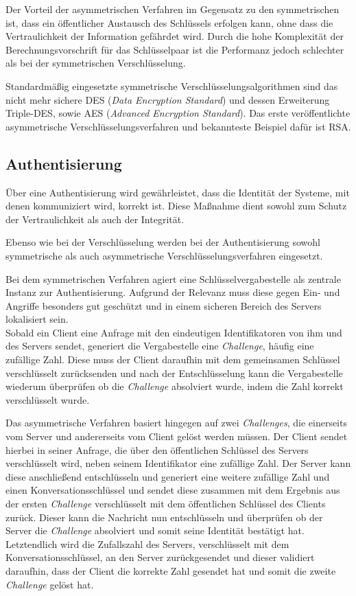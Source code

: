 \documentclass[12pt,a4paper,parskip=half]{scrreprt}
\begin{document}
Der Vorteil der asymmetrischen Verfahren im Gegensatz zu den symmetrischen ist, dass ein öffentlicher Austausch des Schlüssels erfolgen kann, ohne dass die Vertraulichkeit der Information gefährdet wird. Durch die hohe Komplexität der Berechnungsvorschrift für das Schlüsselpaar ist die Performanz jedoch schlechter als bei der symmetrischen Verschlüsselung.

Standardmäßig eingesetzte symmetrische Verschlüsselungsalgorithmen sind das nicht mehr sichere DES (\textit{Data Encryption Standard}) und dessen Erweiterung Triple-DES, sowie AES (\textit{Advanced Encryption Standard}). Das erste veröffentlichte asymmetrische Verschlüsselungsverfahren und bekannteste Beispiel dafür ist RSA.

\subsection{Authentisierung}

Über eine Authentisierung wird gewährleistet, dass die Identität der Systeme, mit denen kommuniziert wird, korrekt ist. Diese Maßnahme dient sowohl zum Schutz der Vertraulichkeit als auch der Integrität.

Ebenso wie bei der Verschlüsselung werden bei der Authentisierung sowohl symmetrische als auch asymmetrische Verschlüsselungsverfahren eingesetzt.

Bei dem symmetrischen Verfahren agiert eine Schlüsselvergabestelle als zentrale Instanz zur Authentisierung. Aufgrund der Relevanz muss diese gegen Ein- und Angriffe besonders gut geschützt und in einem sicheren Bereich des Servers lokalisiert sein. \\
Sobald ein Client eine Anfrage mit den eindeutigen Identifikatoren von ihm und des Servers sendet, generiert die Vergabestelle eine \textit{Challenge}, häufig eine zufällige Zahl. Diese muss der Client daraufhin mit dem gemeinsamen Schlüssel verschlüsselt zurücksenden und nach der Entschlüsselung kann die Vergabestelle wiederum überprüfen ob die \textit{Challenge} absolviert wurde, indem die Zahl korrekt verschlüsselt wurde.

Das asymmetrische Verfahren basiert hingegen auf zwei \textit{Challenges}, die einerseits vom Server und andererseits vom Client gelöst werden müssen. Der Client sendet hierbei in seiner Anfrage, die über den öffentlichen Schlüssel des Servers verschlüsselt wird, neben seinem Identifikator eine zufällige Zahl. Der Server kann diese anschließend entschlüsseln und generiert eine weitere zufällige Zahl und einen Konversationsschlüssel und sendet diese zusammen mit dem Ergebnis aus der ersten \textit{Challenge} verschlüsselt mit dem öffentlichen Schlüssel des Clients zurück. Dieser kann die Nachricht nun entschlüsseln und überprüfen ob der Server die \textit{Challenge} absolviert und somit seine Identität bestätigt hat. Letztendlich wird die Zufallszahl des Servers, verschlüsselt mit dem Konversationsschlüssel, an den Server zurückgesendet und dieser validiert daraufhin, dass der Client die korrekte Zahl gesendet hat und somit die zweite \textit{Challenge} gelöst hat.
\end{document}
